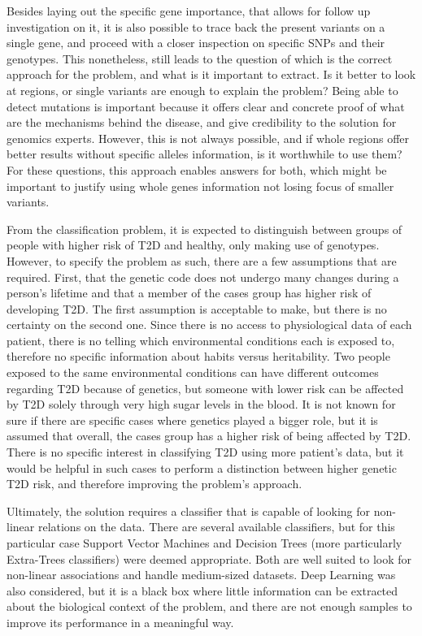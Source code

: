 Besides laying out the specific gene importance, that allows for follow up investigation on it, it is also possible to trace back the present variants on a single gene, and proceed with a closer inspection on specific \gls{SNP}s and their genotypes. This nonetheless, still leads to the question of which is the correct approach for the problem, and what is it important to extract. Is it better to look at regions, or single variants are enough to explain the problem? Being able to detect mutations is important because it offers clear and concrete proof of what are the mechanisms behind the disease, and give credibility to the solution for genomics experts. However, this is not always possible, and if whole regions offer better results without specific alleles information, is it worthwhile to use them? For these questions, this approach enables answers for both, which might be important to justify using whole genes information not losing focus of smaller variants. 

From the classification problem, it is expected to distinguish between groups of people with higher risk of \gls{T2D} and healthy, only making use of genotypes. However, to specify the problem as such, there are a few assumptions that are required. First, that the genetic code does not undergo many changes during a person's lifetime \cite{ali2013genetics} and that a member of the cases group has higher risk of developing \gls{T2D}. The first assumption is acceptable to make, but there is no certainty on the second one. Since there is no access to physiological data of each patient, there is no telling which environmental conditions each is exposed to, therefore no specific information about habits versus heritability. Two people exposed to the same environmental conditions can have different outcomes regarding \gls{T2D} because of genetics, but someone with lower risk can be affected by \gls{T2D} solely through very high sugar levels in the blood. It is not known for sure if there are specific cases where genetics played a bigger role, but it is assumed that overall, the cases group has a higher risk of being affected by \gls{T2D}. There is no specific interest in classifying \gls{T2D} using more patient's data, but it would be helpful in such cases to perform a distinction between higher genetic \gls{T2D} risk, and therefore improving the problem's approach.

Ultimately, the solution requires a classifier that is capable of looking for non-linear relations on the data. There are several available classifiers, but for this particular case Support Vector Machines and Decision Trees (more particularly Extra-Trees classifiers) were deemed appropriate. Both are well suited to look for non-linear associations and handle medium-sized datasets. Deep Learning was also considered, but it is a black box where little information can be extracted about the biological context of the problem, and there are not enough samples to improve its performance in a meaningful way.

